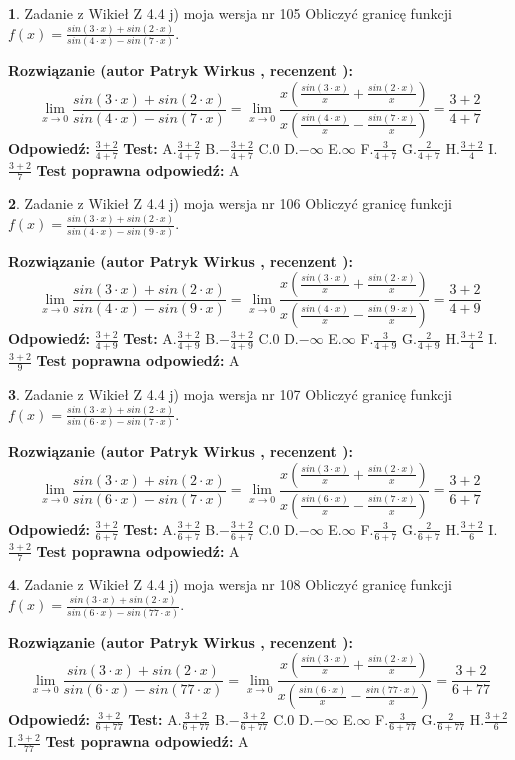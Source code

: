 \documentclass[12pt, a4paper]{article}
\theoremstyle{definition} %
\newtheorem{zad}{}
\newcommand{\zadStart}[1]{\begin{zad}#1\newline}
\newcommand{\zadStop}{\end{zad}}
\newcommand{\rozwStart}[2]{\noindent \textbf{Rozwiązanie (autor #1 , recenzent #2): }\newline}
\newcommand{\rozwStop}{\newline}
\newcommand{\odpStart}{\noindent \textbf{Odpowiedź:}\newline}
\newcommand{\odpStop}{\newline}
\newcommand{\testStart}{\noindent \textbf{Test:}\newline}
\newcommand{\testStop}{\newline}
\newcommand{\kluczStart}{\noindent \textbf{Test poprawna odpowiedź:}\newline}
\newcommand{\kluczStop}{\newline}
\begin{document}
\zadStart{Zadanie z Wikieł Z 4.4 j) moja wersja nr 105}
Obliczyć granicę funkcji $f(x)=\frac{sin(3\cdot x) +sin(2\cdot x)}{sin(4\cdot x) -sin(7\cdot x)}$.
\zadStop
\rozwStart{Patryk Wirkus}{}
$$\lim\limits_{x\to 0}\frac{sin(3\cdot x) +sin(2\cdot x)}{sin(4\cdot x) -sin(7\cdot x)}=\lim\limits_{x\to 0}\frac{x(\frac{sin(3\cdot x)}{x}+\frac{sin(2\cdot x)}{x})}{x(\frac{sin(4\cdot x)}{x}-\frac{sin(7\cdot x)}{x})}=\frac{3+2}{4+7}$$
\rozwStop
\odpStart
$\frac{3+2}{4+7}$
\odpStop
\testStart
A.$\frac{3+2}{4+7}$
B.$-\frac{3+2}{4+7}$
C.$0$
D.$-\infty$
E.$\infty$
F.$\frac{3}{4+7}$
G.$\frac{2}{4+7}$
H.$\frac{3+2}{4}$
I.$\frac{3+2}{7}$
\testStop
\kluczStart
A
\kluczStop



\zadStart{Zadanie z Wikieł Z 4.4 j) moja wersja nr 106}
Obliczyć granicę funkcji $f(x)=\frac{sin(3\cdot x) +sin(2\cdot x)}{sin(4\cdot x) -sin(9\cdot x)}$.
\zadStop
\rozwStart{Patryk Wirkus}{}
$$\lim\limits_{x\to 0}\frac{sin(3\cdot x) +sin(2\cdot x)}{sin(4\cdot x) -sin(9\cdot x)}=\lim\limits_{x\to 0}\frac{x(\frac{sin(3\cdot x)}{x}+\frac{sin(2\cdot x)}{x})}{x(\frac{sin(4\cdot x)}{x}-\frac{sin(9\cdot x)}{x})}=\frac{3+2}{4+9}$$
\rozwStop
\odpStart
$\frac{3+2}{4+9}$
\odpStop
\testStart
A.$\frac{3+2}{4+9}$
B.$-\frac{3+2}{4+9}$
C.$0$
D.$-\infty$
E.$\infty$
F.$\frac{3}{4+9}$
G.$\frac{2}{4+9}$
H.$\frac{3+2}{4}$
I.$\frac{3+2}{9}$
\testStop
\kluczStart
A
\kluczStop



\zadStart{Zadanie z Wikieł Z 4.4 j) moja wersja nr 107}
Obliczyć granicę funkcji $f(x)=\frac{sin(3\cdot x) +sin(2\cdot x)}{sin(6\cdot x) -sin(7\cdot x)}$.
\zadStop
\rozwStart{Patryk Wirkus}{}
$$\lim\limits_{x\to 0}\frac{sin(3\cdot x) +sin(2\cdot x)}{sin(6\cdot x) -sin(7\cdot x)}=\lim\limits_{x\to 0}\frac{x(\frac{sin(3\cdot x)}{x}+\frac{sin(2\cdot x)}{x})}{x(\frac{sin(6\cdot x)}{x}-\frac{sin(7\cdot x)}{x})}=\frac{3+2}{6+7}$$
\rozwStop
\odpStart
$\frac{3+2}{6+7}$
\odpStop
\testStart
A.$\frac{3+2}{6+7}$
B.$-\frac{3+2}{6+7}$
C.$0$
D.$-\infty$
E.$\infty$
F.$\frac{3}{6+7}$
G.$\frac{2}{6+7}$
H.$\frac{3+2}{6}$
I.$\frac{3+2}{7}$
\testStop
\kluczStart
A
\kluczStop



\zadStart{Zadanie z Wikieł Z 4.4 j) moja wersja nr 108}
Obliczyć granicę funkcji $f(x)=\frac{sin(3\cdot x) +sin(2\cdot x)}{sin(6\cdot x) -sin(77\cdot x)}$.
\zadStop
\rozwStart{Patryk Wirkus}{}
$$\lim\limits_{x\to 0}\frac{sin(3\cdot x) +sin(2\cdot x)}{sin(6\cdot x) -sin(77\cdot x)}=\lim\limits_{x\to 0}\frac{x(\frac{sin(3\cdot x)}{x}+\frac{sin(2\cdot x)}{x})}{x(\frac{sin(6\cdot x)}{x}-\frac{sin(77\cdot x)}{x})}=\frac{3+2}{6+77}$$
\rozwStop
\odpStart
$\frac{3+2}{6+77}$
\odpStop
\testStart
A.$\frac{3+2}{6+77}$
B.$-\frac{3+2}{6+77}$
C.$0$
D.$-\infty$
E.$\infty$
F.$\frac{3}{6+77}$
G.$\frac{2}{6+77}$
H.$\frac{3+2}{6}$
I.$\frac{3+2}{77}$
\testStop
\kluczStart
A
\kluczStop
\end{document}
